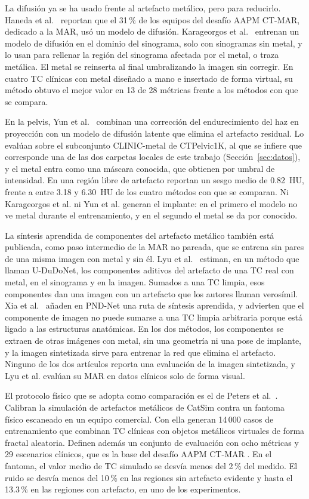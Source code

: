 La difusión ya se ha usado frente al artefacto metálico, pero para reducirlo. Haneda et al.~\cite{haneda2025aapm} reportan que el 31\,\% de los equipos del desafío AAPM CT-MAR, dedicado a la MAR, usó un modelo de difusión. Karageorgos et al.~\cite{karageorgos2024ddpm} entrenan un modelo de difusión en el dominio del sinograma, solo con sinogramas sin metal, y lo usan para rellenar la región del sinograma afectada por el metal, o traza metálica. El metal se reinserta al final umbralizando la imagen sin corregir. En cuatro TC clínicas con metal diseñado a mano e insertado de forma virtual, su método obtuvo el mejor valor en 13 de 28 métricas frente a los métodos con que se compara.

En la pelvis, Yun et al.~\cite{yun2026simulationdriven} combinan una corrección del endurecimiento del haz en proyección con un modelo de difusión latente que elimina el artefacto residual. Lo evalúan sobre el subconjunto CLINIC-metal de CTPelvic1K, al que se infiere que corresponde una de las dos carpetas locales de este trabajo (Sección~\ref{sec:datos}), y el metal entra como una máscara conocida, que obtienen por umbral de intensidad. En una región libre de artefacto reportan un sesgo medio de 0.82~HU, frente a entre 3.18 y 6.30~HU de los cuatro métodos con que se comparan. Ni Karageorgos et al. ni Yun et al. generan el implante: en el primero el modelo no ve metal durante el entrenamiento, y en el segundo el metal se da por conocido.

La síntesis aprendida de componentes del artefacto metálico también está publicada, como paso intermedio de la MAR no pareada, que se entrena sin pares de una misma imagen con metal y sin él. Lyu et al.~\cite{lyu2021ududonet} estiman, en un método que llaman U-DuDoNet, los componentes aditivos del artefacto de una TC real con metal, en el sinograma y en la imagen. Sumados a una TC limpia, esos componentes dan una imagen con un artefacto que los autores llaman verosímil. Xia et al.~\cite{xia2024pndnet} añaden en PND-Net una ruta de síntesis aprendida, y advierten que el componente de imagen no puede sumarse a una TC limpia arbitraria porque está ligado a las estructuras anatómicas. En los dos métodos, los componentes se extraen de otras imágenes con metal, sin una geometría ni una pose de implante, y la imagen sintetizada sirve para entrenar la red que elimina el artefacto. Ninguno de los dos artículos reporta una evaluación de la imagen sintetizada, y Lyu et al. evalúan su MAR en datos clínicos solo de forma visual.

El protocolo físico que se adopta como comparación es el de Peters et al.~\cite{peters2025hybrid}. Calibran la simulación de artefactos metálicos de CatSim contra un fantoma físico escaneado en un equipo comercial. Con ella generan 14\,000 casos de entrenamiento que combinan TC clínicas con objetos metálicos virtuales de forma fractal aleatoria. Definen además un conjunto de evaluación con ocho métricas y 29 escenarios clínicos, que es la base del desafío AAPM CT-MAR \cite{haneda2025aapm}. En el fantoma, el valor medio de TC simulado se desvía menos del 2\,\% del medido. El ruido se desvía menos del 10\,\% en las regiones sin artefacto evidente y hasta el 13.3\,\% en las regiones con artefacto, en uno de los experimentos.

